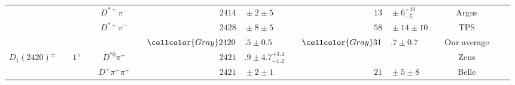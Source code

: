 \begin{adjustbox}{width=0.76\textwidth,center}
{\begin{tabular}{cp{5pt}cp{5pt}cp{5pt}r@{}lp{5pt}r@{}lp{5pt}cp{5pt}c}
		                                         &                  &                              &                  & $D^{*+}\pi^{-}$                 &                       & $	2414$                       & ${}\pm2\pm5	$                                 &                       & $	13$                                            & ${}\pm6^{+10}_{-5}	$                         &                       & Argus                                                         &                       & \cite{Albrecht:1989pa}                    \\
		                                         &                  &                              &                  & $D^{*+}\pi^{-}$                 &                       & $	2428$                       & ${} \pm 8 \pm5	$                              &                       & $	58$                                            & ${}\pm14 \pm10	$                             &                       & TPS                                                           &                       & \cite{Anjos:1988uf}                       \\ \cmidrule{6-14}
		                                         &                  &                              &                  &                                 & \cellcolor{Gray}      & $	\cellcolor{Gray} 2420$      & \cellcolor{Gray}$.5 \pm 0.5	$                 & \cellcolor{Gray}      & $	\cellcolor{Gray} 31$                           & \cellcolor{Gray}$.7 \pm 0.7	$                & \cellcolor{Gray}      & \cellcolor{Gray} Our average                                  & \cellcolor{Gray}      &                                           \\ \midrule
		\multirow{5}{*}{$D_{1}^{}(2420)^{\pm}$}  &                  & \multirow{5}{*}{$1^{+}$}     &                  & $D^{*0}\pi^{+}$                 &                       & $	2421$                       & $.9\pm4.7^{+3.4}_{-1.2}	$                     &                       &                                                  &                                              &                       & Zeus                                                          &                       & \cite{Abramowicz:2012ys}                  \\
		                                         &                  &                              &                  & $D^{+}\pi^{-}\pi^{+}$           &                       & $	2421$                       & ${}\pm2\pm1	$                                 &                       & $	21$                                            & ${}\pm5\pm8	$                                &                       & Belle                                                         &                       & \cite{Abe:2004sm}                         \\

\end{tabular}}
\end{adjustbox}
